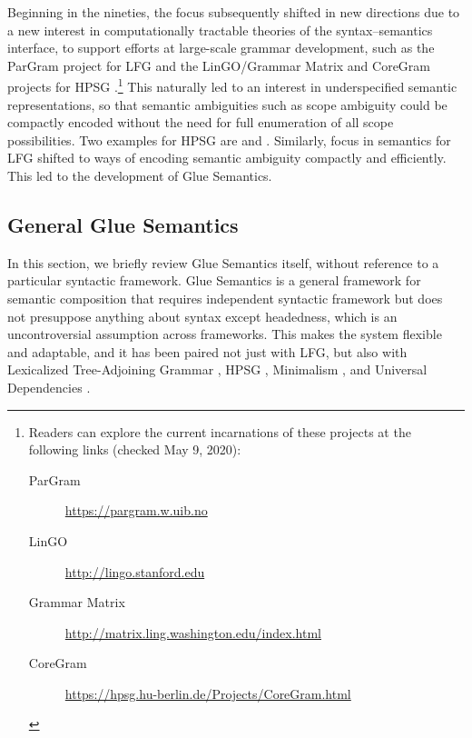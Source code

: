 Beginning in the nineties, the focus subsequently shifted in new directions due to a new interest in computationally tractable
theories of the syntax--semantics interface, to support efforts at
large-scale grammar development, such as the ParGram project for LFG
\citep{butt;ea99,butt;ea02-pargram} and the LinGO/Grammar Matrix and CoreGram projects for HPSG
\citep{flickinger00,bender;ea02,bender;ea10,MuellerCoreGram}.\footnote{Readers can
  explore the current incarnations of these projects at the following
links (checked May 9, 2020):
\begin{description}
\item[ParGram] \url{https://pargram.w.uib.no}
\item[LinGO] \url{http://lingo.stanford.edu}
\item[Grammar Matrix] \url{http://matrix.ling.washington.edu/index.html}
\item[CoreGram] \url{https://hpsg.hu-berlin.de/Projects/CoreGram.html}
\end{description}
} This naturally led to an
interest in underspecified semantic representations, so that semantic
ambiguities such as scope ambiguity could be compactly encoded without
the need for full enumeration of all scope possibilities. Two examples
for HPSG are  \citep{richter04,penn;richter04}
and 
\citep{copestake;ea05}. Similarly, focus in semantics for LFG shifted
to ways of encoding semantic ambiguity compactly and efficiently. This
led to the development of Glue Semantics.



\subsection{General Glue Semantics}
\label{sec:glue-semantics}

In this section, we briefly review Glue Semantics itself, 
without reference to a particular
syntactic framework.  Glue Semantics is a general framework for
semantic composition that requires  independent syntactic
framework but does not presuppose anything about syntax except
headedness, which is an uncontroversial assumption across
frameworks. This makes the system flexible and adaptable, and it has
been paired not just with LFG, but also with Lexicalized
Tree-Adjoining Grammar \citep{frank;genabith01}, HPSG
\citep{asudeh;crouch01-hpsg-glue}, Minimalism \citep{Gotham2018}, and
Universal Dependencies \citep{gotham;haug18}.

